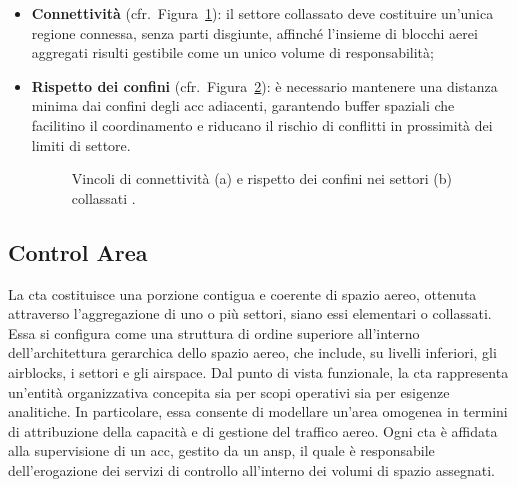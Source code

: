\begin{itemize}
  \item {\bf Connettività} (cfr.~Figura~\ref{fig:connectivity}): il settore collassato deve costituire un’unica regione connessa, senza parti disgiunte, affinché l’insieme di blocchi aerei aggregati risulti gestibile come un unico volume di responsabilità;
  \item {\bf Rispetto dei confini} (cfr.~Figura~\ref{fig:boundary}): è necessario mantenere una distanza minima dai confini degli \gls{acc} adiacenti, garantendo buffer spaziali che facilitino il coordinamento e riducano il rischio di conflitti in prossimità dei limiti di settore.
  \begin{figure}[htbp]
    \centering
    \begin{subfigure}[b]{0.45\textwidth}
      \centering
      
      \label{fig:connectivity}
    \end{subfigure}\hfill
    \begin{subfigure}[b]{0.45\textwidth}
      \centering
      
      \label{fig:boundary}
    \end{subfigure}
    \caption{Vincoli di connettività (a) e rispetto dei confini nei settori (b) collassati \cite{treimuth2018dynamic}.}
    \label{fig:constraints_cd}
  \end{figure}
\end{itemize}
\EnablePunct
\subsection{Control Area}
La \gls{cta} costituisce una porzione contigua e coerente di spazio aereo, ottenuta attraverso l’aggregazione di uno o più settori, siano essi elementari o collassati. Essa si configura come una struttura di ordine superiore all’interno dell’architettura gerarchica dello spazio aereo, che include, su livelli inferiori, gli airblocks, i settori e gli airspace.
Dal punto di vista funzionale, la \gls{cta} rappresenta un'entità organizzativa concepita sia per scopi operativi sia per esigenze analitiche. In particolare, essa consente di modellare un’area omogenea in termini di attribuzione della capacità e di gestione del traffico aereo. Ogni \gls{cta} è affidata alla supervisione di un \gls{acc}, gestito da un \gls{ansp}, il quale è responsabile dell’erogazione dei servizi di controllo all’interno dei volumi di spazio assegnati.

